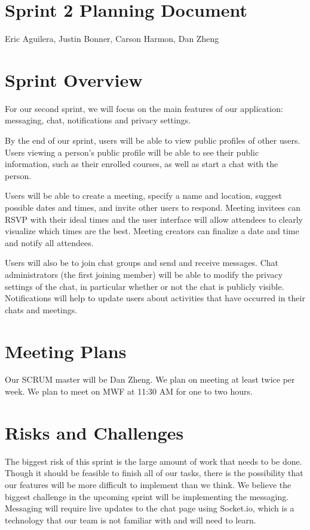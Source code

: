 \documentclass[12pt]{article}
\newcommand{\hwTitle}{Sprint 2 Planning Document}
\newcommand{\authorName}{Eric Aguilera, Justin Bonner, Carson Harmon, Dan Zheng}
\begin{document}
\section*{\Large \centering \hwTitle}
{\centering \authorName \par}

\section{Sprint Overview}
For our second sprint, we will focus on the main features of our application: messaging, chat, notifications and privacy settings.

By the end of our sprint, users will be able to view public profiles of other users. Users viewing a person’s public profile will be able to see their public information, such as their enrolled courses, as well as start a chat with the person.

Users will be able to create a meeting, specify a name and location, suggest possible dates and times, and invite other users to respond. Meeting invitees can RSVP with their ideal times and the user interface will allow attendees to clearly visualize which times are the best. Meeting creators can finalize a date and time and notify all attendees.

Users will also be to join chat groups and send and receive messages. Chat administrators (the first joining member) will be able to modify the privacy settings of the chat, in particular whether or not the chat is publicly visible. Notifications will help to update users about activities that have occurred in their chats and meetings.

\section{Meeting Plans}
Our SCRUM master will be Dan Zheng. We plan on meeting at least twice per week. We plan to meet on MWF at 11:30 AM for one to two hours.

\section{Risks and Challenges}
The biggest risk of this sprint is the large amount of work that needs to be done. Though it should be feasible to finish all of our tasks, there is the possibility that our features will be more difficult to implement than we think. We believe the biggest challenge in the upcoming sprint will be implementing the messaging. Messaging will require live updates to the chat page using Socket.io, which is a technology that our team is not familiar with and will need to learn.
\end{document}
